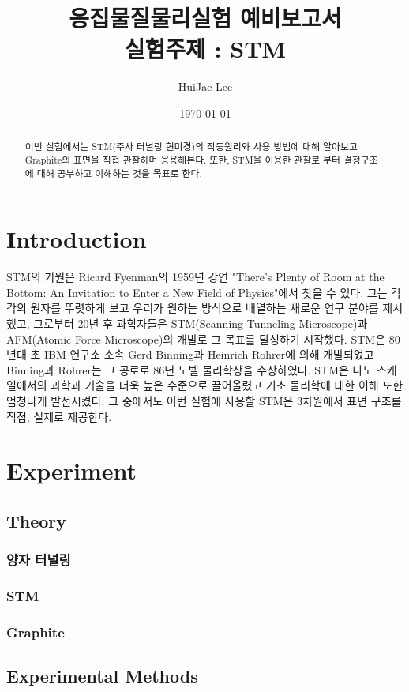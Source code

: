 \documentclass[aps,reprint,superscriptaddress,11pt]{revtex4-2}
\begin{document}
\title{응집물질물리실험 예비보고서 \\
\small 실험주제 : STM}

\author{HuiJae-Lee}

\date{\today}


\begin{abstract}
  이번 실험에서는 STM(주사 터널링 현미경)의 작동원리와 사용 방법에 대해 알아보고 
  Graphite의 표면을 직접 관찰하며 응용해본다. 또한, STM을 이용한 관찰로 부터 결정구조에 대해
  공부하고 이해하는 것을 목표로 한다.
 \end{abstract}
 
 \maketitle
 
 \section[Introduction]{Introduction}
 STM의 기원은 Ricard Fyenman의 1959년 강연 "There's Plenty of Room at the Bottom: 
 An Invitation to Enter a New Field of Physics"에서 찾을 수 있다. 그는 각각의 
 원자를 뚜렷하게 보고 우리가 원하는 방식으로 배열하는 새로운 연구 분야를 
 제시했고, 그로부터 20년 후 과학자들은 STM(Scanning Tunneling Microscope)과 
 AFM(Atomic Force Microscope)의 개발로 그 목표를 달성하기 시작했다. 
 STM은 80년대 초 IBM 연구소 소속 Gerd Binning과 Heinrich Rohrer에 의해 개발되었고 
 Binning과 Rohrer는 그 공로로 86년 노벨 물리학상을 수상하였다.
 STM은 나노 스케일에서의 과학과 기술을 더욱 높은 수준으로 끌어올렸고 기초 물리학에 대한 
 이해 또한 엄청나게 발전시켰다. 그 중에서도 이번 실험에 사용할 STM은 3차원에서 표면 구조를 
 직접, 실제로 제공한다.

\section[Experiment]{Experiment}
\subsection{Theory}
\subsubsection{양자 터널링}

\subsubsection{STM}



\subsubsection{Graphite}

\subsection{Experimental Methods}


\nocite{*}





\vfill
\end{document}
